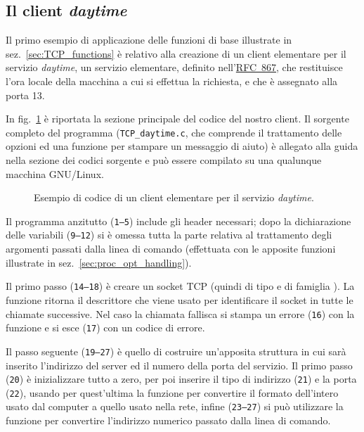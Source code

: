 \subsection{Il client \textit{daytime}}
\label{sec:TCP_daytime_client}

Il primo esempio di applicazione delle funzioni di base illustrate in
sez.~\ref{sec:TCP_functions} è relativo alla creazione di un client elementare
per il servizio \textit{daytime}, un servizio elementare, definito
nell'\href{http://www.ietf.org/rfc/rfc867.txt}{RFC~867}, che restituisce
l'ora locale della macchina a cui si effettua la richiesta, e che è assegnato
alla porta 13.

In fig.~\ref{fig:TCP_daytime_client_code} è riportata la sezione principale
del codice del nostro client. Il sorgente completo del programma
(\texttt{TCP\_daytime.c}, che comprende il trattamento delle opzioni ed una
funzione per stampare un messaggio di aiuto) è allegato alla guida nella
sezione dei codici sorgente e può essere compilato su una qualunque macchina
GNU/Linux.

\begin{figure}[!htbp]
  \footnotesize \centering
  \begin{minipage}[c]{\codesamplewidth}
  \end{minipage} 
  \normalsize
  \caption{Esempio di codice di un client elementare per il servizio
    \textit{daytime}.} 
  \label{fig:TCP_daytime_client_code}
\end{figure}

Il programma anzitutto (\texttt{\small 1--5}) include gli header necessari;
dopo la dichiarazione delle variabili (\texttt{\small 9--12}) si è omessa
tutta la parte relativa al trattamento degli argomenti passati dalla linea di
comando (effettuata con le apposite funzioni illustrate in
sez.~\ref{sec:proc_opt_handling}).

Il primo passo (\texttt{\small 14--18}) è creare un socket TCP (quindi di tipo
 e di famiglia ). La funzione
 ritorna il descrittore che viene usato per identificare il
socket in tutte le chiamate successive. Nel caso la chiamata fallisca si
stampa un errore (\texttt{\small 16}) con la funzione  e si esce
(\texttt{\small 17}) con un codice di errore.

Il passo seguente (\texttt{\small 19--27}) è quello di costruire un'apposita
struttura  in cui sarà inserito l'indirizzo del server ed
il numero della porta del servizio. Il primo passo (\texttt{\small 20}) è
inizializzare tutto a zero, per poi inserire il tipo di indirizzo
(\texttt{\small 21}) e la porta (\texttt{\small 22}), usando per quest'ultima
la funzione  per convertire il formato dell'intero usato dal
computer a quello usato nella rete, infine (\texttt{\small 23--27}) si può
utilizzare la funzione  per convertire l'indirizzo numerico
passato dalla linea di comando.

